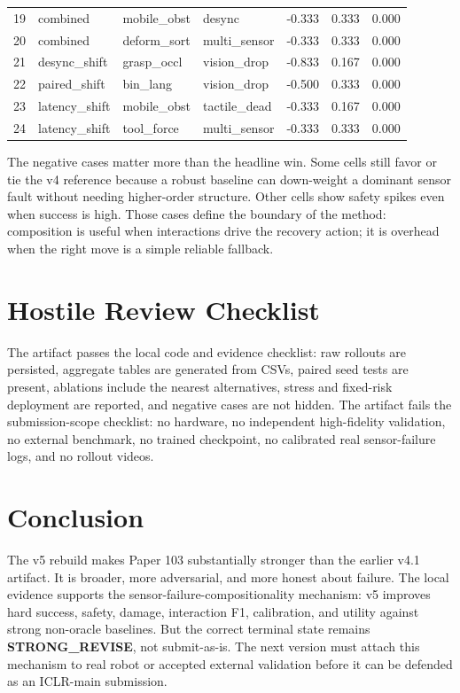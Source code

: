 \documentclass{article}
\begin{document}
\begin{longtable}{@{}rllllrr@{}}
19 & combined & mobile\_obst & desync & -0.333 & 0.333 & 0.000 \\
20 & combined & deform\_sort & multi\_sensor & -0.333 & 0.333 & 0.000 \\
21 & desync\_shift & grasp\_occl & vision\_drop & -0.833 & 0.167 & 0.000 \\
22 & paired\_shift & bin\_lang & vision\_drop & -0.500 & 0.333 & 0.000 \\
23 & latency\_shift & mobile\_obst & tactile\_dead & -0.333 & 0.167 & 0.000 \\
24 & latency\_shift & tool\_force & multi\_sensor & -0.333 & 0.333 & 0.000 \\
\bottomrule
\end{longtable}

The negative cases matter more than the headline win. Some cells still favor or tie the v4 reference because a robust baseline can down-weight a dominant sensor fault without needing higher-order structure. Other cells show safety spikes even when success is high. Those cases define the boundary of the method: composition is useful when interactions drive the recovery action; it is overhead when the right move is a simple reliable fallback.

\section{Hostile Review Checklist}
The artifact passes the local code and evidence checklist: raw rollouts are persisted, aggregate tables are generated from CSVs, paired seed tests are present, ablations include the nearest alternatives, stress and fixed-risk deployment are reported, and negative cases are not hidden. The artifact fails the submission-scope checklist: no hardware, no independent high-fidelity validation, no external benchmark, no trained checkpoint, no calibrated real sensor-failure logs, and no rollout videos.

\section{Conclusion}
The v5 rebuild makes Paper 103 substantially stronger than the earlier v4.1 artifact. It is broader, more adversarial, and more honest about failure. The local evidence supports the sensor-failure-compositionality mechanism: v5 improves hard success, safety, damage, interaction F1, calibration, and utility against strong non-oracle baselines. But the correct terminal state remains \textbf{STRONG\_REVISE}, not submit-as-is. The next version must attach this mechanism to real robot or accepted external validation before it can be defended as an ICLR-main submission.



\end{document}
